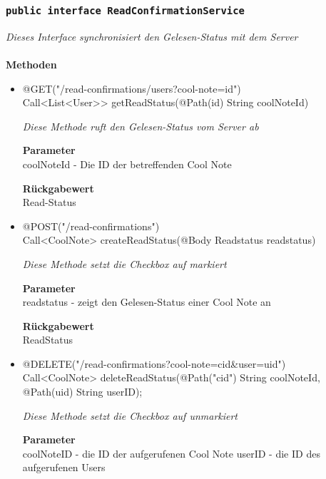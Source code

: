 	\subsubsection{\texttt{public interface ReadConfirmationService }}
\textit{Dieses Interface synchronisiert den Gelesen-Status mit dem Server}\\
\\
	\textbf{Methoden} \\

    \begin{itemize}
		\item{@GET("/read-confirmations/users?cool-note={id}") \\ Call<List<User>> getReadStatus(@Path(\grqq id\grqq) String coolNoteId)}

		\textit{Diese Methode ruft den Gelesen-Status vom Server ab}

		\textbf{Parameter} \\
	 coolNoteId - Die ID der betreffenden Cool Note

		\textbf{Rückgabewert} \\
	Read-Status

	\item{@POST("/read-confirmations") \\ Call<CoolNote> createReadStatus(@Body Readstatus readstatus) } 

		\textit{Diese Methode setzt die Checkbox auf markiert}

		\textbf{Parameter} \\
	 readstatus - zeigt den Gelesen-Status einer Cool Note an

		\textbf{Rückgabewert} \\
	ReadStatus



	\item{@DELETE("/read-confirmations?cool-note={cid}\&user={uid}")}
\\Call<CoolNote> deleteReadStatus(@Path("cid") String coolNoteId,
			     @Path(\grqq uid\grqq) String userID);

		\textit{Diese Methode setzt die Checkbox auf unmarkiert}

		\textbf{Parameter} \\
	coolNoteID - die ID der aufgerufenen Cool Note
	userID - die ID des aufgerufenen Users

	
	 \end{itemize}


